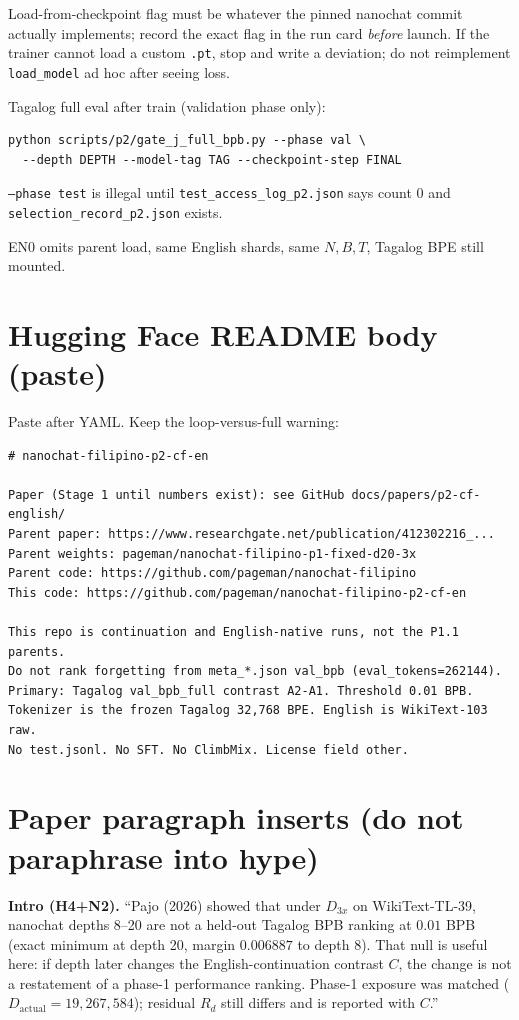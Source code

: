 \documentclass[11pt,a4paper]{article}
\begin{document}
Load-from-checkpoint flag must be whatever the pinned nanochat commit actually implements; record the exact flag in the run card \emph{before} launch. If the trainer cannot load a custom \texttt{.pt}, stop and write a deviation; do not reimplement \texttt{load\_model} ad hoc after seeing loss.

Tagalog full eval after train (validation phase only):

\begin{verbatim}
python scripts/p2/gate_j_full_bpb.py --phase val \
  --depth DEPTH --model-tag TAG --checkpoint-step FINAL
\end{verbatim}

\texttt{--phase test} is illegal until \texttt{test\_access\_log\_p2.json} says count $0$ and \texttt{selection\_record\_p2.json} exists.

EN0 omits parent load, same English shards, same $N,B,T$, Tagalog BPE still mounted.

\section{Hugging Face README body (paste)}
\label{app:hf}

Paste after YAML. Keep the loop-versus-full warning:

\begin{verbatim}
# nanochat-filipino-p2-cf-en

Paper (Stage 1 until numbers exist): see GitHub docs/papers/p2-cf-english/
Parent paper: https://www.researchgate.net/publication/412302216_...
Parent weights: pageman/nanochat-filipino-p1-fixed-d20-3x
Parent code: https://github.com/pageman/nanochat-filipino
This code: https://github.com/pageman/nanochat-filipino-p2-cf-en

This repo is continuation and English-native runs, not the P1.1 parents.
Do not rank forgetting from meta_*.json val_bpb (eval_tokens=262144).
Primary: Tagalog val_bpb_full contrast A2-A1. Threshold 0.01 BPB.
Tokenizer is the frozen Tagalog 32,768 BPE. English is WikiText-103 raw.
No test.jsonl. No SFT. No ClimbMix. License field other.
\end{verbatim}

\section{Paper paragraph inserts (do not paraphrase into hype)}
\label{app:paras}

\textbf{Intro (H4+N2).} ``Pajo (2026) showed that under $D_{3x}$ on WikiText-TL-39, nanochat depths 8--20 are not a held-out Tagalog BPB ranking at $0.01$ BPB (exact minimum at depth 20, margin $0.006887$ to depth 8). That null is useful here: if depth later changes the English-continuation contrast $C$, the change is not a restatement of a phase-1 performance ranking. Phase-1 exposure was matched ($D_{\mathrm{actual}}=19{,}267{,}584$); residual $R_d$ still differs and is reported with $C$.''
\end{document}

